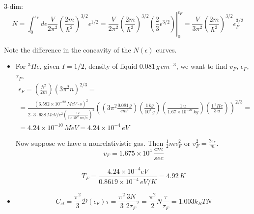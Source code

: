 3-dim:
\[
N = \int_0^{\epsilon_F} d\epsilon \frac{V}{2\pi^2} \left( \frac{2m}{ \hbar^2} \right)^{3/2} \epsilon^{1/2} = \left. \frac{V}{2\pi^2} \left( \frac{2m}{ \hbar^2} \right)^{3/2} \left( \frac{2}{3} \epsilon^{3/2} \right) \right|_0^{\epsilon_F} = \frac{V}{3\pi^2} \left( \frac{2m}{ \hbar^2 }\right)^{3/2} \epsilon_F^{3/2}
\]

Note the difference in the concavity of the $N(\epsilon)$ curves.

\begin{itemize}
\item[(a)] For $^{3}He$, given $I = 1/2$, density of liquid $0.081 \, g \, cm^{-3}$, we want to find $v_F$, $\epsilon_F$, $\tau_F$.  
\[
\begin{gathered}
  \epsilon_F = \left( \frac{ \hbar^2}{ 2m} \right) (3\pi^2 n)^{2/3} = \\
  = \frac{ (6.582 \times 10^{-22} \, MeV \cdot s )^2 }{ 2 \cdot 3 \cdot 938 \, MeV/c^2 \left( \frac{1 \, c}{ 3\times 10^{10} \, cm/s } \right)^2 } \left( \left( 3 \pi^2 \frac{ 0.081 \, g }{cm^3} \right) \left( \frac{1 \, kg}{ 10^3 \, g} \right) \left( \frac{1 \, u }{ 1.67 \times 10^{-27} \, kg } \right) \left( \frac{ 1 \, ^{3}He}{ 3 \, u } \right) \right)^{2/3} = \\
  = 4.24 \times 10^{-10} \, MeV = 4.24 \times 10^{-4} \, eV
\end{gathered}
\]

Now suppose we have a nonrelativistic gas.  Then $\frac{1}{2} m v_F^2$ or $v_F^2 = \frac{2\epsilon_F}{m}$.
\[
v_F = 1.675 \times 10^4 \, \frac{cm}{sec}
\]

\[
T_F  = \frac{4.24 \times 10^{-4 } eV}{ 0.8619 \times 10^{-4} \, eV/K } = 4.92 \, K
\]
\item[(b)] 
\[
C_{el} = \frac{\pi^2}{3} \mathcal{D}(\epsilon_F)\tau = \frac{\pi^2}{3} \frac{3N}{2\tau_F} \tau = \frac{\pi^2}{2} N \frac{\tau}{\tau_F} = 1.003 k_B T N
\]
\end{itemize}





